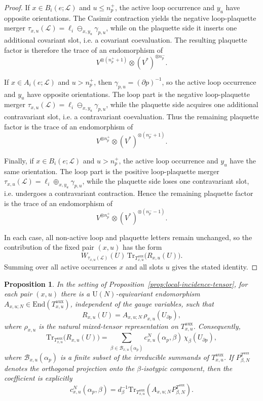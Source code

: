 \documentclass[11pt,a4paper,reqno]{article}
\newtheorem{proposition}[theorem]{Proposition}
\theoremstyle{definition}
\theoremstyle{remark}
\newcommand\U{{\mathrm U}}
\newcommand\Tr{\mathrm{Tr}}
\newcommand\End{{\mathrm{End}}}
\newcommand\Lc{{\mathcal{L}}}
\newcommand\B{{\mathcal{B}}}
\begin{document}
\begin{proof}
If $x\in B_i(e;\Lc)$ and $u\le n_p^+$, the active loop occurrence and $y_u$ have opposite orientations. The Casimir contraction yields the negative loop-plaquette merger $\tau_{x,u}(\Lc)=\ell_i\ominus_{x,y_u}\gamma_{p,u}$, while on the plaquette side it inserts one additional covariant slot, i.e. a covariant coevaluation. The resulting plaquette factor is therefore the trace of an endomorphism of
\[
V^{\otimes(n_p^++1)}\otimes (V^*)^{\otimes n_p^-}.
\]

If $x\in A_i(e;\Lc)$ and $u>n_p^+$, then $\gamma_{p,u}=(\partial p)^{-1}$, so the active loop occurrence and $y_u$ have opposite orientations. The loop part is the negative loop-plaquette merger $\tau_{x,u}(\Lc)=\ell_i\ominus_{x,y_u}\gamma_{p,u}$, while the plaquette side acquires one additional contravariant slot, i.e. a contravariant coevaluation. Thus the remaining plaquette
factor is the trace of an endomorphism of
\[
V^{\otimes n_p^+}\otimes (V^*)^{\otimes(n_p^-+1)}.
\]

Finally, if $x\in B_i(e;\Lc)$ and $u>n_p^+$, the active loop occurrence and $y_u$ have the same orientation. The loop part is the positive loop-plaquette merger $\tau_{x,u}(\Lc)=\ell_i\oplus_{x,y_u}\gamma_{p,u}$, while the plaquette side loses one contravariant slot, i.e. undergoes a contravariant contraction. Hence the remaining plaquette
factor is the trace of an endomorphism of
\[
V^{\otimes n_p^+}\otimes (V^*)^{\otimes(n_p^--1)}.
\]

In each case, all non-active loop and plaquette letters remain unchanged, so the contribution of the fixed pair $(x,u)$ has the form
\[
W_{\tau_{x,u}(\Lc)}(U)\,\mathrm{Tr}_{T^{\mathrm{aux}}_{x,u}}\!\bigl(R_{x,u}(U)\bigr).
\]
Summing over all active occurrences $x$ and all slots $u$ gives the stated identity.
\end{proof}

\begin{proposition}\label{prop:explicit-incidence-recoupling}
In the setting of Proposition~\ref{prop:local-incidence-tensor}, for each pair $(x,u)$ there is a $\U(N)$-equivariant endomorphism $A_{x,u;N}\in\End(T^{\mathrm{aux}}_{x,u})$, independent of the gauge variables, such that
\[
R_{x,u}(U)=A_{x,u;N}\,\rho_{x,u}(U_{\partial p}),
\]
where $\rho_{x,u}$ is the natural mixed-tensor representation on $T^{\mathrm{aux}}_{x,u}$. Consequently,
\[
\Tr_{T^{\mathrm{aux}}_{x,u}}\!\bigl(R_{x,u}(U)\bigr)=\sum_{\beta\in \B_{x,u}(\alpha_p)}c^N_{x,u}(\alpha_p,\beta)\,\chi_\beta(U_{\partial p}),
\]
where $\B_{x,u}(\alpha_p)$ is a finite subset of the irreducible summands of $T^{\mathrm{aux}}_{x,u}$. If $P^{T^{\mathrm{aux}}}_{\beta,N}$ denotes the orthogonal projection onto the $\beta$-isotypic component, then the coefficient is explicitly
\begin{equation}\label{eq:incidence-recoupling-coefficient}
c^N_{x,u}(\alpha_p,\beta)
=d_\beta^{-1}\Tr_{T^{\mathrm{aux}}_{x,u}}\!\left(A_{x,u;N}P^{T^{\mathrm{aux}}}_{\beta,N}\right).
\end{equation}
\end{proposition}
\end{document}
